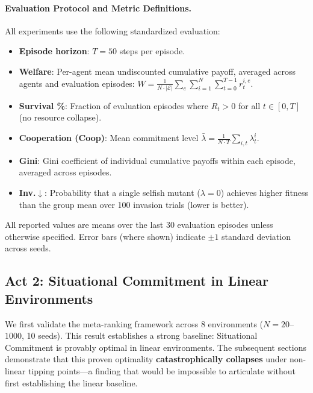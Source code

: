 \documentclass{article}
\begin{document}
\paragraph{Evaluation Protocol and Metric Definitions.}
All experiments use the following standardized evaluation:
\begin{itemize}
    \item \textbf{Episode horizon}: $T = 50$ steps per episode.
    \item \textbf{Welfare}: Per-agent mean undiscounted cumulative payoff, averaged across agents and evaluation episodes: $W = \frac{1}{N \cdot |\mathcal{E}|} \sum_{e} \sum_{i=1}^{N} \sum_{t=0}^{T-1} r_t^{i,e}$.
    \item \textbf{Survival \%}: Fraction of evaluation episodes where $R_t > 0$ for all $t \in [0, T]$ (no resource collapse).
    \item \textbf{Cooperation (Coop)}: Mean commitment level $\bar{\lambda} = \frac{1}{N \cdot T} \sum_{i,t} \lambda_t^i$.
    \item \textbf{Gini}: Gini coefficient of individual cumulative payoffs within each episode, averaged across episodes.
    \item \textbf{Inv.$\downarrow$}: Probability that a single selfish mutant ($\lambda{=}0$) achieves higher fitness than the group mean over 100 invasion trials (lower is better).
\end{itemize}
All reported values are means over the last 30 evaluation episodes unless otherwise specified. Error bars (where shown) indicate $\pm 1$ standard deviation across seeds.

\subsection{Act 2: Situational Commitment in Linear Environments}
\label{sec:linear}

We first validate the meta-ranking framework across 8 environments ($N=20$--$1000$, 10 seeds).
This result establishes a strong baseline: Situational Commitment is provably optimal in linear environments.
The subsequent sections demonstrate that this proven optimality \textbf{catastrophically collapses} under non-linear tipping points---a finding that would be impossible to articulate without first establishing the linear baseline.
\end{document}
